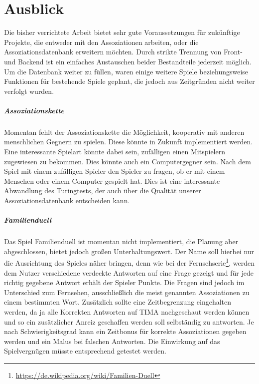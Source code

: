 \chapter{Ausblick}\label{ch:ausblick}

Die bisher verrichtete Arbeit bietet sehr gute Voraussetzungen für zukünftige Projekte, die entweder mit den Assoziationen arbeiten, oder die Assoziationsdatenbank erweitern möchten. Durch strikte Trennung von Front- und Backend ist ein einfaches Austauschen beider Bestandteile jederzeit möglich.
Um die Datenbank weiter zu füllen, waren einige weitere Spiele beziehungsweise Funktionen für bestehende Spiele geplant, die jedoch aus Zeitgründen nicht weiter verfolgt wurden.

\paragraph{Assoziationskette}
Momentan fehlt der Assoziationskette die Möglichkeit, kooperativ mit anderen menschlichen Gegnern zu spielen. Diese könnte in Zukunft implementiert werden. Eine interessante Spielart könnte dabei sein, zufälligen einen Mitspielern zugewiesen zu bekommen. Dies könnte auch ein Computergegner sein. Nach dem Spiel mit einem zufälligen Spieler den Spieler zu fragen, ob er mit einem Menschen oder einem Computer gespielt hat. Dies ist eine interessante Abwandlung des Turingtests, der auch über die Qualität unserer Assoziationsdatenbank entscheiden kann.

\paragraph{Familienduell}
Das Spiel Familienduell ist momentan nicht implementiert, die Planung aber abgeschlossen, bietet jedoch großen Unterhaltungswert. Der Name soll hierbei nur die Ausrichtung des Spieles näher bringen,
denn wie bei der
Fernsehserie\footnote{\url{https://de.wikipedia.org/wiki/Familien-Duell}},
werden dem Nutzer verschiedene verdeckte Antworten auf eine Frage gezeigt
und für jede richtig gegebene Antwort erhält der Spieler Punkte.
Die Fragen sind jedoch im Unterschied zum Fernsehen, ausschließlich die meist
genannten Assoziationen zu einem bestimmten Wort. Zusätzlich sollte eine
Zeitbegrenzung eingehalten werden, da ja alle Korrekten Antworten auf TIMA
nachgeschaut werden können und so ein zusätzlicher Anreiz geschaffen werden soll selbständig zu antworten. Je nach Schwierigkeitsgrad kann ein Zeitbonus für korrekte Assoziationen
gegeben werden und ein Malus bei falschen Antworten. Die Einwirkung auf das
Spielvergnügen müsste entsprechend getestet werden.

